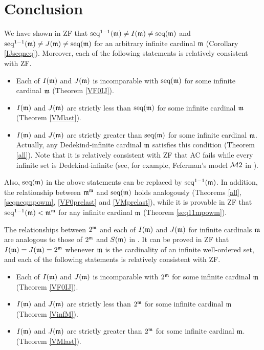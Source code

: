 \chapter{Conclusion}

We have shown in ZF that $\seq^{1-1}(\frak{m}) \neq I(\frak{m}) \neq \seq(\frak{m})$ and $\seq^{1-1}(\frak{m}) \neq J(\frak{m}) \neq \seq(\frak{m})$ for an arbitrary infinite cardinal $\frak{m}$ (Corollary \ref{IJseqneq}). Moreover, each of the following statements is relatively consistent with ZF.
\begin{itemize}
\item Each of $I(\frak{m})$ and $J(\frak{m})$ is incomparable with $\seq(\frak{m})$ for some infinite cardinal $\frak{m}$ (Theorem \ref{VF0IJ}).
\item $I(\frak{m})$ and $J(\frak{m})$ are strictly less than $\seq(\frak{m})$ for some infinite cardinal $\frak{m}$ (Theorem \ref{VMlast}).
\item $I(\frak{m})$ and $J(\frak{m})$ are strictly greater than $\seq(\frak{m})$ for some infinite cardinal $\frak{m}$. Actually, any Dedekind-infinite cardinal $\frak{m}$ satisfies this condition (Theorem \ref{all}). Note that it is relatively consistent with ZF that AC fails while every infinite set is Dedekind-infinite (see, for example, Feferman's model $\mcal{M}2$ in \cite{HowardRubin}).
\end{itemize}
Also, $\seq(\frak{m})$ in the above statements can be replaced by $\seq^{1-1}(\frak{m})$. In addition, the relationship between $\frak{m}^\frak{m}$ and $\seq(\frak{m})$ holds analogously (Theorems \ref{all}, \ref{seqneqmpowm}, \ref{VF0prelast} and \ref{VMprelast}), while it is provable in ZF that $\seq^{1-1}(\frak{m}) < \frak{m}^\frak{m}$ for any infinite cardinal $\frak{m}$ (Theorem \ref{seq11mpowm}).

The relationships between $2^\frak{m}$ and each of $I(\frak{m})$ and $J(\frak{m})$ for infinite cardinals $\frak{m}$ are analogous to those of $2^\frak{m}$ and $S(\frak{m})$ in \cite{DH}. It can be proved in ZF that $I(\frak{m})=J(\frak{m})=2^\frak{m}$ whenever $\frak{m}$ is the cardinality of an infinite well-ordered set, and each of the following statements is relatively consistent with ZF.
\begin{itemize}
\item Each of $I(\frak{m})$ and $J(\frak{m})$ is incomparable with $2^\frak{m}$ for some infinite cardinal $\frak{m}$ (Theorem \ref{VF0IJ}).
\item $I(\frak{m})$ and $J(\frak{m})$ are strictly less than $2^\frak{m}$ for some infinite cardinal $\frak{m}$ (Theorem \ref{VinfM}).
\item $I(\frak{m})$ and $J(\frak{m})$ are strictly greater than $2^\frak{m}$ for some infinite cardinal $\frak{m}$. (Theorem \ref{VMlast}).
\end{itemize}

